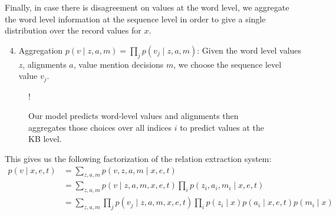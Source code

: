 \documentclass[12pt]{article}
\begin{document}
Finally, in case there is disagreement on values at the word level,
we aggregate the word level information at the sequence level in order
to give a single distribution over the record values for $x$.
\begin{enumerate}
\setcounter{enumi}{3}
\item Aggregation $p(v \mid z,a,m) = \prod_j p(v_j \mid z,a,m)$:
    Given the word level values $z$, alignments $a$, value mention decisions $m$,
    we choose the sequence level value $v_j$.
\end{enumerate}

\begin{figure}[h]
\begin{center}
\resizebox {.3\columnwidth} {!} {
} %
\end{center}
\caption{Our model predicts word-level values and alignments
then aggregates those choices over all indices $i$ to
predict values at the KB level.
}
\label{fig:infmodel}
\end{figure}

This gives us the following factorization of the relation extraction system:
\begin{equation}
\label{eqn:prob}
\begin{aligned}
p(v \mid x,e,t) &= \sum_{z,a,m} p(v,z,a,m\mid x,e,t)\\
&= \sum_{z,a,m} p(v\mid z,a,m,x,e,t) \prod_i p(z_i, a_i, m_i\mid x,e,t)\\
&= \sum_{z,a,m} \prod_j p(v_j\mid z,a,m,x,e,t) \prod_i p(z_i\mid x)p(a_i\mid x,e,t)p(m_i\mid x)\\
\end{aligned}
\end{equation}
\end{document}
